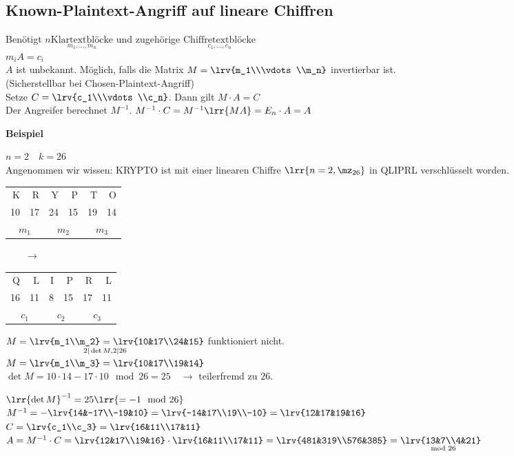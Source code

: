 	\subsection{Known-Plaintext-Angriff auf lineare Chiffren}
		Benötigt $n \underset{m_1,\dots,m_n}{\mbox{Klartextblöcke}}$ und zugehörige $\underset{c_1,\dots,c_n}{\mbox{Chiffretextblöcke}}$\\
		$m_iA=c_i$\\
		$A$ ist unbekannt. Möglich, falls die Matrix $M=\lrv{m_1\\\vdots\\m_n}$ invertierbar ist.\\
		(Sicherstellbar bei Chosen-Plaintext-Angriff)\\
		Setze $C=\lrv{c_1\\\vdots\\c_n}$. Dann gilt $M\cdot A=C$\\
		Der Angreifer berechnet $M^{-1}$. $M^{-1}\cdot C = M^{-1}\lrr{MA}=E_n\cdot A = A$
		
		\textbf{Beispiel}
		
		$n=2\quad k=26$\\
		Angenommen wir wissen: KRYPTO ist mit einer linearen Chiffre $\lrr{n=2,\mz_{26}}$ in QLIPRL verschlüsselt worden.
		
		\begin{tabular}{rr|rr|rr}
			K&R&Y&P&T&O\\
			10&17&24&15&19&14\\
			\multicolumn{2}{c|}{$m_1$}&\multicolumn{2}{c|}{$m_2$}&\multicolumn{2}{c}{$m_3$}
		\end{tabular}
		$\qquad \rightarrow\qquad$
		\begin{tabular}{rr|rr|rr}
			Q&L&I&P&R&L\\
			16&11&8&15&17&11\\
			\multicolumn{2}{c|}{$c_1$}&\multicolumn{2}{c|}{$c_2$}&\multicolumn{2}{c}{$c_3$}
		\end{tabular}
		
		$\underset{2|\det M, 2|26}{M = \lrv{m_1\\m_2}=\lrv{10&17\\24&15}}$ funktioniert nicht.\\
		$M=\lrv{m_1\\m_3}=\lrv{10&17\\19&14}$\\
		$\det M = 10\cdot 14 - 17\cdot 10 \mod 26 = 25\quad\rightarrow$ teilerfremd zu $26$.
		
		$\lrr{\det M}^{-1} = 25\lrr{=-1\mod 26}$\\
		$M^{-1} = -\lrv{14&-17\\-19&10} = \lrv{-14&17\\19\\-10}=\lrv{12&17&19&16}$\\
		$C=\lrv{c_1\\c_3}=\lrv{16&11\\17&11}$\\
		$A=M^{-1}\cdot C = \lrv{12&17\\19&16}\cdot\lrv{16&11\\17&11}=\lrv{481&319\\576&385}=\underset{\mod 26}{\lrv{13&7\\4&21}}$
		

